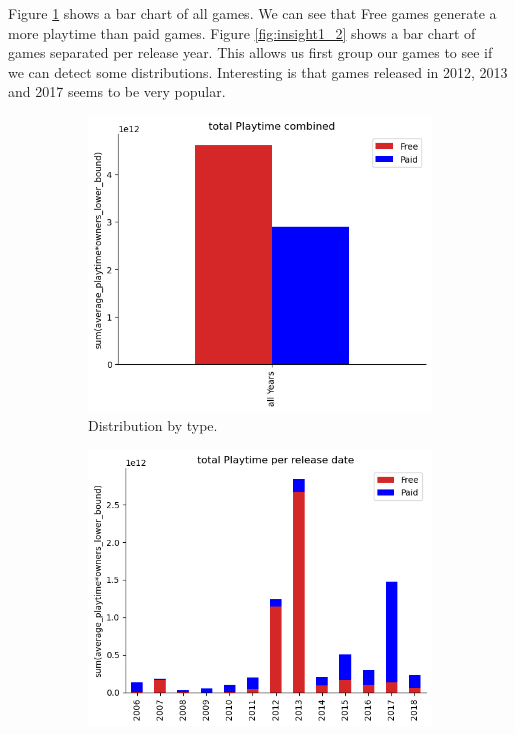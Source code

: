 \documentclass[11pt]{article}
\begin{document}
Figure \ref{fig:insight1_1} shows a bar chart of all games. We can see that Free games generate a more playtime than paid games.
Figure \ref{fig:insight1_2} shows a bar chart of games separated per release year. This allows us first group our games to see if we can detect some distributions. Interesting is that games released in 2012, 2013 and 2017 seems to be very popular. 
\begin{figure}
    \centering
    \begin{subfigure}[b]{0.475\textwidth}
        \centering
        \includegraphics[width=1\textwidth]{graphics/insight1_graph1.png}
        \caption{Distribution by type.}
        \label{fig:insight1_1}
    \end{subfigure}
    \hfill
    \begin{subfigure}[b]{0.475\textwidth}
        \centering
        \includegraphics[width=1\textwidth]{graphics/insight1_graph2.png}

\end{subfigure}
\end{figure}
\end{document}
